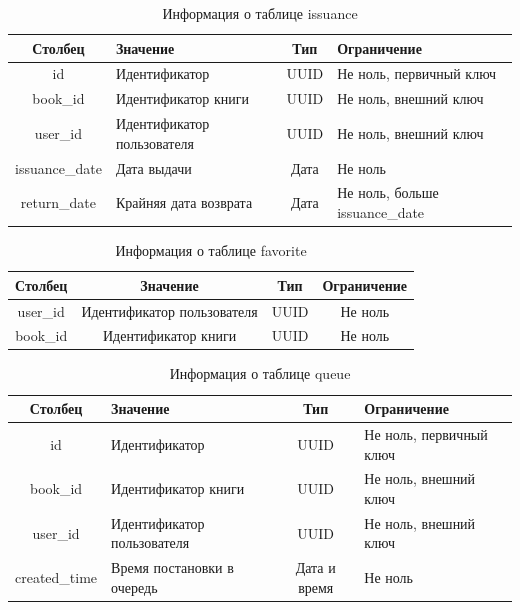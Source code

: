 \begin{table}[H]
	\begin{center}
		\caption{Информация о таблице issuance}
		\begin{tabular}{|c|p{4cm}|c|p{4cm}|}
			\hline
			\textbf{Столбец} & \textbf{Значение} & \textbf{Тип} & \textbf{Ограничение} \\
			\hline
			id & Идентификатор & UUID & Не ноль, первичный ключ \\
			\hline
			book\_id & Идентификатор книги & UUID & Не ноль, внешний ключ \\
			\hline
			user\_id & Идентификатор пользователя & UUID & Не ноль, внешний ключ \\
			\hline
			issuance\_date & Дата выдачи & Дата & Не ноль \\
			\hline
			return\_date & Крайняя дата возврата & Дата & Не ноль, больше issuance\_date \\
			\hline
		\end{tabular}
		\label{tbl:favorite}
	\end{center}
\end{table}

\begin{table}[H]
	\begin{center}
		\caption{Информация о таблице favorite}
		\begin{tabular}{|c|c|c|c|}
			\hline
			\textbf{Столбец} & \textbf{Значение} & \textbf{Тип} & \textbf{Ограничение} \\
			\hline
			user\_id & Идентификатор пользователя & UUID & Не ноль \\
			\hline
			book\_id & Идентификатор книги & UUID & Не ноль \\
			\hline
		\end{tabular}
	\end{center}
\end{table}


\begin{table}[H]
    \begin{center}
        \caption{Информация о таблице queue}
        \begin{tabular}{|c|p{4cm}|c|p{4cm}|}
            \hline
            \textbf{Столбец} & \textbf{Значение} & \textbf{Тип} & \textbf{Ограничение} \\
            \hline
            id & Идентификатор & UUID & Не ноль, первичный ключ \\
            \hline
            book\_id & Идентификатор книги & UUID & Не ноль, внешний ключ \\
            \hline
            user\_id & Идентификатор пользователя & UUID & Не ноль, внешний ключ \\
            \hline
            created\_time & Время постановки в очередь & Дата и время & Не ноль \\
            \hline
        \end{tabular}
        \label{tbl:queue}
    \end{center}
\end{table}

